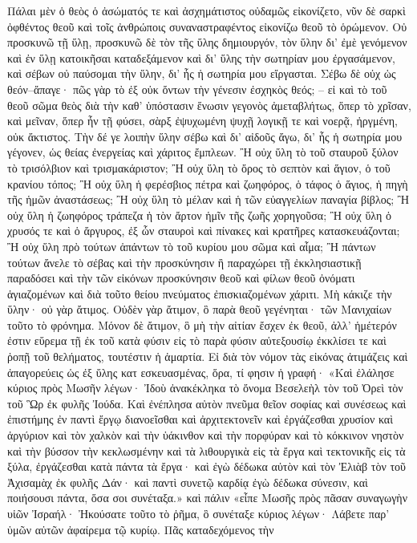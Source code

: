 \documentclass[10pt]{book}
\begin{document}
\begin{paracol}{2}
Πάλαι μὲν ὁ θεὸς ὁ ἀσώματός τε καὶ ἀσχημάτιστος οὐδαμῶς εἰκονίζετο, νῦν δὲ
σαρκὶ ὀφθέντος θεοῦ καὶ τοῖς ἀνθρώποις συναναστραφέντος εἰκονίζω θεοῦ τὸ
ὁρώμενον.  Οὐ προσκυνῶ τῇ ὕλῃ, προσκυνῶ δὲ τὸν τῆς ὕλης δημιουργόν, τὸν ὕλην
δι’ ἐμὲ γενόμενον καὶ ἐν ὕλῃ κατοικῆσαι καταδεξάμενον καὶ δι’ ὕλης τὴν
σωτηρίαν μου ἐργασάμενον, καὶ σέβων οὐ παύσομαι τὴν ὕλην, δι’ ἧς ἡ σωτηρία μου
εἴργασται.  Σέβω δὲ οὐχ ὡς θεόν–ἄπαγε· πῶς γὰρ τὸ ἐξ οὐκ ὄντων τὴν γένεσιν
ἐσχηκὸς θεός; – εἰ καὶ τὸ τοῦ θεοῦ σῶμα θεὸς διὰ τὴν καθ’ ὑπόστασιν ἕνωσιν
γεγονὸς ἀμεταβλήτως, ὅπερ τὸ χρῖσαν, καὶ μεῖναν, ὅπερ ἦν τῇ φύσει, σὰρξ
ἐψυχωμένη ψυχῇ λογικῇ τε καὶ νοερᾷ, ἠργμένη, οὐκ ἄκτιστος.  Τὴν δέ γε λοιπὴν
ὕλην σέβω καὶ δι’ αἰδοῦς ἄγω, δι’ ἧς ἡ σωτηρία μου γέγονεν, ὡς θείας ἐνεργείας
καὶ χάριτος ἔμπλεων.  Ἢ οὐχ ὕλη τὸ τοῦ σταυροῦ ξύλον τὸ τρισόλβιον καὶ
τρισμακάριστον; Ἢ οὐχ ὕλη τὸ ὄρος τὸ σεπτὸν καὶ ἅγιον, ὁ τοῦ κρανίου τόπος; Ἢ
οὐχ ὕλη ἡ φερέσβιος πέτρα καὶ ζωηφόρος, ὁ τάφος ὁ ἅγιος, ἡ πηγὴ τῆς ἡμῶν
ἀναστάσεως; Ἢ οὐχ ὕλη τὸ μέλαν καὶ ἡ τῶν εὐαγγελίων παναγία βίβλος; Ἢ οὐχ ὕλη
ἡ ζωηφόρος τράπεζα ἡ τὸν ἄρτον ἡμῖν τῆς ζωῆς χορηγοῦσα; Ἢ οὐχ ὕλη ὁ χρυσός τε
καὶ ὁ ἄργυρος, ἐξ ὧν σταυροὶ καὶ πίνακες καὶ κρατῆρες κατασκευάζονται; Ἢ οὐχ
ὕλη πρὸ τούτων ἁπάντων τὸ τοῦ κυρίου μου σῶμα καὶ αἷμα; Ἢ πάντων τούτων ἄνελε
τὸ σέβας καὶ τὴν προσκύνησιν ἢ παραχώρει τῇ ἐκκλησιαστικῇ παραδόσει καὶ τὴν
τῶν εἰκόνων προσκύνησιν θεοῦ καὶ φίλων θεοῦ ὀνόματι ἁγιαζομένων καὶ διὰ τοῦτο
θείου πνεύματος ἐπισκιαζομένων χάριτι. Μὴ κάκιζε τὴν ὕλην· οὐ γὰρ ἄτιμος.
Οὐδὲν γὰρ ἄτιμον, ὃ παρὰ θεοῦ γεγένηται· τῶν Μανιχαίων τοῦτο τὸ φρόνημα.
Μόνον δὲ ἄτιμον, ὃ μὴ τὴν αἰτίαν ἔσχεν ἐκ θεοῦ, ἀλλ’ ἡμέτερόν ἐστιν εὕρεμα τῇ
ἐκ τοῦ κατὰ φύσιν εἰς τὸ παρὰ φύσιν αὐτεξουσίῳ ἐκκλίσει τε καὶ ῥοπῇ τοῦ
θελήματος, τουτέστιν ἡ ἁμαρτία.  Εἰ διὰ τὸν νόμον τὰς εἰκόνας ἀτιμάζεις καὶ
ἀπαγορεύεις ὡς ἐξ ὕλης κατ εσκευασμένας, ὅρα, τί φησιν ἡ γραφή· «Καὶ ἐλάλησε
κύριος πρὸς Μωσῆν λέγων· Ἰδοὺ ἀνακέκληκα τὸ ὄνομα Βεσελεὴλ τὸν τοῦ Ὀρεὶ τὸν
τοῦ Ὣρ ἐκ φυλῆς Ἰούδα.  Καὶ ἐνέπλησα αὐτὸν πνεῦμα θεῖον σοφίας καὶ συνέσεως
καὶ ἐπιστήμης ἐν παντὶ ἔργῳ διανοεῖσθαι καὶ ἀρχιτεκτονεῖν καὶ ἐργάζεσθαι
χρυσίον καὶ ἀργύριον καὶ τὸν χαλκὸν καὶ τὴν ὑάκινθον καὶ τὴν πορφύραν καὶ τὸ
κόκκινον νηστὸν καὶ τὴν βύσσον τὴν κεκλωσμένην καὶ τὰ λιθουργικὰ εἰς τὰ ἔργα
καὶ τεκτονικῆς εἰς τὰ ξύλα, ἐργάζεσθαι κατὰ πάντα τὰ ἔργα· καὶ ἐγὼ δέδωκα
αὐτὸν καὶ τὸν Ἐλιὰβ τὸν τοῦ Ἀχισαμὰχ ἐκ φυλῆς Δάν· καὶ παντὶ συνετῷ καρδίᾳ ἐγὼ
δέδωκα σύνεσιν, καὶ ποιήσουσι πάντα, ὅσα σοι συνέταξα.» καὶ πάλιν «εἶπε Μωσῆς
πρὸς πᾶσαν συναγωγὴν υἱῶν Ἰσραήλ· Ἠκούσατε τοῦτο τὸ ῥῆμα, ὃ συνέταξε κύριος
λέγων· Λάβετε παρ’ ὑμῶν αὐτῶν ἀφαίρεμα τῷ κυρίῳ.  Πᾶς καταδεχόμενος τὴν

\end{paracol}
\end{document}

